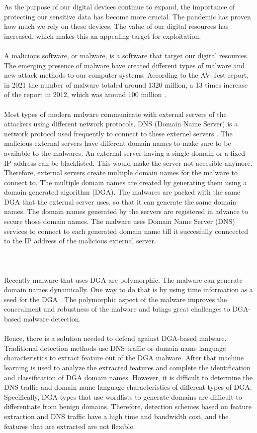 As the purpose of our digital devices continue to expand, the importance of protecting our sensitive data has become more crucial. The pandemic has proven how much we rely on these devices. The value of our digital resources has increased, which makes this an appealing target for exploitation.\\\\ 
A malicious software, or malware, is a software that target our digital resources. The emerging presence of malware have created different types of malware and new attack methods to our computer systems. According to the AV-Test report, in 2021 the number of malware totaled around 1320 million, a 13 times increase of the report in 2012, which was around 100 million \cite{avtest}.\\\\
Most types of modern malware communicate with external servers of the attackers using different network protocols. DNS (Domain Name Server) is a network protocol used frequently to connect to these externel servers \cite{ist}. The malicious external servers have different domain names to make sure to be available to the malwares. An external server having a single domain or a fixed IP address can be blacklisted. This would make the server not accesible anymore. Therefore, external servers create multiple domain names for the malware to connect to. The multiple domain names are created by generating them using a domain generated algorithm (DGA). The malwares are packed with the same DGA that the external server uses, so that it can generate the same domain names. The domain names generated by the servers are registered in advance to secure those domain names. The malware uses Domain Name Server (DNS) services to connect to each generated domain name till it succesfully conncected to the IP address of the malicious external server.\\\\
\pagebreak
\\\\Recently malware that uses DGA are polymorphic. The malware can generate domain names dynamically. One way to do that is by using time information as a seed for the DGA \cite{arntz_2016}. The polymorphic aspect of the malware improves the concealment and robustness of the malware and brings great challenges to DGA-based malware detection. \\\\ 
Hence, there is a solution needed to defend against DGA-based malware. Traditional detection methods use DNS traffic or domain name language characteristics to extract feature out of the DGA malware. After that machine learning is used to analyze the extracted features and complete the identification and classification of DGA domain names. However, it is difficult to determine the DNS traffic and domain name language characteristics of different types of DGA. Specifically, DGA types that use wordlists to generate domains are difficult to differentiate from benign domains. Therefore, detection schemes based on feature extraction and DNS traffic have a high time and bandwidth cost, and the features that are extracted are not flexible. \\\\ 
